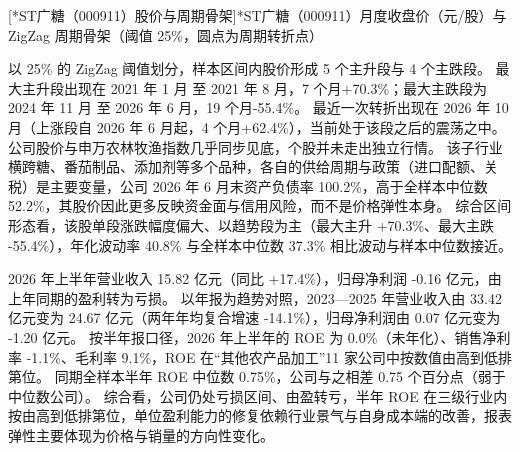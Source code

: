 \begin{center}
\begin{minipage}{\textwidth}\centering
{}

[*ST广糖（000911）股价与周期骨架]{*ST广糖（000911）月度收盘价（元/股）与 ZigZag 周期骨架（阈值 25\%，圆点为周期转折点）}
\end{minipage}
\end{center}

 以 25\% 的 ZigZag 阈值划分，样本区间内股价形成 5 个主升段与 4 个主跌段。 最大主升段出现在 2021 年 1 月 至 2021 年 8 月，7 个月+70.3\%；最大主跌段为 2024 年 11 月 至 2026 年 6 月，19 个月-55.4\%。 最近一次转折出现在 2026 年 10 月（上涨段自 2026 年 6 月起，4 个月+62.4\%），当前处于该段之后的震荡之中。 公司股价与申万农林牧渔指数几乎同步见底，个股并未走出独立行情。 该子行业横跨糖、番茄制品、添加剂等多个品种，各自的供给周期与政策（进口配额、关税）是主要变量，公司 2026 年 6 月末资产负债率 100.2\%，高于全样本中位数 52.2\%，其股价因此更多反映资金面与信用风险，而不是价格弹性本身。 综合区间形态看，该股单段涨跌幅度偏大、以趋势段为主（最大主升 +70.3\%、最大主跌 -55.4\%），年化波动率 40.8\% 与全样本中位数 37.3\% 相比波动与样本中位数接近。

 2026 年上半年营业收入 15.82 亿元（同比 +17.4\%），归母净利润 -0.16 亿元，由上年同期的盈利转为亏损。 以年报为趋势对照，2023---2025 年营业收入由 33.42 亿元变为 24.67 亿元（两年年均复合增速 -14.1\%），归母净利润由 0.07 亿元变为 -1.20 亿元。 按半年报口径，2026 年上半年的 ROE 为 0.0\%（未年化）、销售净利率 -1.1\%、毛利率 9.1\%，ROE 在“其他农产品加工”11 家公司中按数值由高到低排第位。 同期全样本半年 ROE 中位数 0.75\%，公司与之相差 0.75 个百分点（弱于中位数公司）。 综合看，公司仍处亏损区间、由盈转亏，半年 ROE 在三级行业内按由高到低排第位，单位盈利能力的修复依赖行业景气与自身成本端的改善，报表弹性主要体现为价格与销量的方向性变化。

